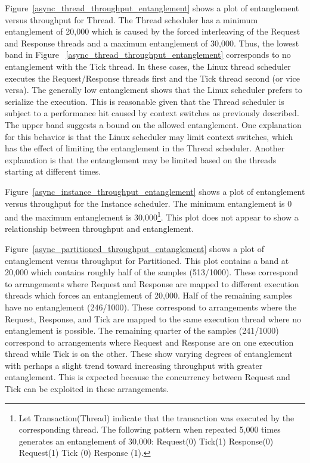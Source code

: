 Figure~\ref{async_thread_throughput_entanglement} shows a plot of entanglement versus throughput for Thread.
The Thread scheduler has a minimum entanglement of 20,000 which is caused by the forced interleaving of the Request and Response threads and a maximum entanglement of 30,000.
Thus, the lowest band in Figure ~\ref{async_thread_throughput_entanglement} corresponds to no entanglement with the Tick thread.
In these cases, the Linux thread scheduler executes the Request/Response threads first and the Tick thread second (or vice versa).
The generally low entanglement shows that the Linux scheduler prefers to serialize the execution.
This is reasonable given that the Thread scheduler is subject to a performance hit caused by context switches as previously described.
The upper band suggests a bound on the allowed entanglement.
One explanation for this behavior is that the Linux scheduler may limit context switches, which has the effect of limiting the entanglement in the Thread scheduler.
Another explanation is that the entanglement may be limited based on the threads starting at different times.

Figure~\ref{async_instance_throughput_entanglement} shows a plot of entanglement versus throughput for the Instance scheduler.
The minimum entanglement is 0 and the maximum entanglement is 30,000\footnote{Let Transaction(Thread) indicate that the transaction was executed by the corresponding thread.  The following pattern when repeated 5,000 times generates an entanglement of 30,000:  Request(0) Tick(1) Response(0) Request(1) Tick (0) Response (1).}.
This plot does not appear to show a relationship between throughput and entanglement.

Figure~\ref{async_partitioned_throughput_entanglement} shows a plot of entanglement versus throughput for Partitioned.
This plot contains a band at 20,000 which contains roughly half of the samples (513/1000).
These correspond to arrangements where Request and Response are mapped to different execution threads which forces an entanglement of 20,000.
Half of the remaining samples have no entanglement (246/1000).
These correspond to arrangements where the Request, Response, and Tick are mapped to the same execution thread where no entanglement is possible.
The remaining quarter of the samples (241/1000) correspond to arrangements where Request and Response are on one execution thread while Tick is on the other.
These show varying degrees of entanglement with perhaps a slight trend toward increasing throughput with greater entanglement.
This is expected because the concurrency between Request and Tick can be exploited in these arrangements.

